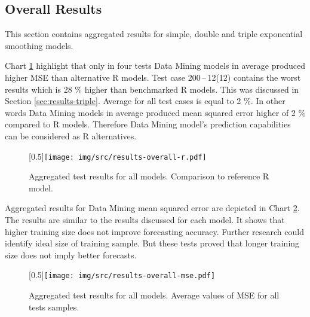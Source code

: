         \subsection{Overall Results} \label{sec:overall}
        This section contains aggregated results for simple, double and triple exponential smoothing models.

        Chart \ref{img:results-overall-r} highlight that only in four tests Data Mining models in average produced
        higher MSE than alternative R models. Test case 200\,--\,12(12) contains the worst results which is 28 \%
        higher than benchmarked R models. This was discussed in Section \ref{sec:results-triple}. Average for all
        test cases is equal to 2 \%. In other words Data Mining models in average produced mean squared error higher of
        2 \% compared to R models. Therefore Data Mining model's prediction capabilities can be considered as R alternatives.

        \begin{figure}[H]
            \begin{center}
                \scalebox{0.65}[0.5]{\texttt{[image: img/src/results-overall-r.pdf]}}
                \caption{Aggregated test results for all models. Comparison to reference R model.}
                \label{img:results-overall-r}
            \end{center}
        \end{figure}

        Aggregated results for Data Mining mean squared error are depicted in Chart \ref{img:results-overall-mse}. The
        results are similar to the results discussed for each model. It shows that higher training size does not
        improve forecasting accuracy. Further research could identify ideal size of training sample. But these tests
        proved that longer training size does not imply better forecasts.

        \begin{figure}[H]
            \begin{center}
                \scalebox{0.65}[0.5]{\texttt{[image: img/src/results-overall-mse.pdf]}}
                \caption{Aggregated test results for all models. Average values of MSE for all tests
                samples.}
                \label{img:results-overall-mse}
            \end{center}
        \end{figure}

